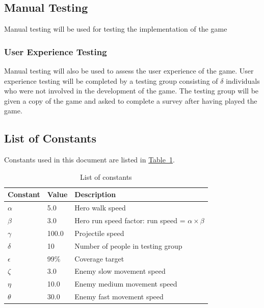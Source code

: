 \documentclass[12pt, titlepage]{article}
\begin{document}
\subsection{Manual Testing}
Manual testing will be used for testing the implementation of the game 

\subsubsection{User Experience Testing}
Manual testing will also be used to assess the user experience of the game.  User experience testing will be completed by a testing group consisting of $\hyperref[tab:constants]{\delta}$ individuals who were not involved in the development of the game.  The testing group will be given a copy of the game and asked to complete a survey after having played the game.  


\subsection{List of Constants}
Constants used in this document are listed in \hyperref[tab:constants]{Table~\ref*{tab:constants}}.
\begin{table}[ht]
\caption{List of constants} \label{tab:constants}
\begin{tabularx}{\textwidth}{p{3cm}p{2cm}X}
\toprule {\bf Constant} & {\bf Value} & {\bf Description}\\
\midrule
$\alpha$ & 5.0 & Hero walk speed\\
$\beta$ & 3.0 & Hero run speed factor: run speed = $\alpha \times \beta$\\
$\gamma$ & 100.0 & Projectile speed\\
$\delta$ & 10 & Number of people in testing group\\
$\epsilon$ & 99\% & Coverage target\\
$\zeta$ & 3.0 & Enemy slow movement speed\\
$\eta$ & 10.0 & Enemy medium movement speed\\
$\theta$ & 30.0 & Enemy fast movement speed\\
\bottomrule
\end{tabularx}
\end{table}
\end{document}
